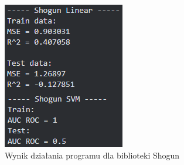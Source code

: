 \begin{figure}[!ht]
	\centering
	\begin{minipage}{0.32\textwidth}
		\centering
		\includegraphics[width=\linewidth]{Rozdzial7/shogun}
		\caption{Wynik działania programu dla biblioteki Shogun}
		\label{fig:shogun_linear_svm}		
	\end{minipage}%
    \hspace{0.02\textwidth}
	\begin{minipage}{0.32\textwidth}
		\centering

\end{minipage}
\end{figure}
